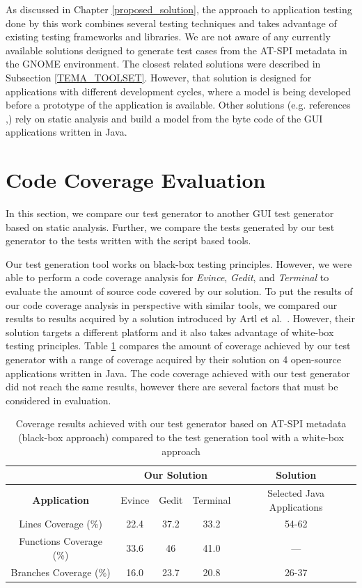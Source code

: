 As discussed in Chapter \ref{proposed_solution}, the approach to application testing done by this work combines several testing techniques and takes advantage of existing testing frameworks and libraries. We are not aware of any currently available solutions designed to generate test cases from the AT-SPI metadata in the GNOME environment. The closest related solutions were described in Subsection \ref{TEMA_TOOLSET}. However, that solution is designed for applications with different development cycles, where a model is being developed before a prototype of the application is available. Other solutions (e.g. references \cite{ReisJacinto2018Aetw},\cite{ArltS2012LSAf}) rely on static analysis and build a model from the byte code of the GUI applications written in Java.

\section{Code Coverage Evaluation}\label{code_coverage_evaluation}
In this section, we compare our test generator to another GUI test generator based on static analysis. Further, we compare the tests generated by our test generator to the tests written with the script based tools. 

Our test generation tool works on black-box testing principles. However, we were able to perform a code coverage analysis for \textit{Evince}, \textit{Gedit}, and \textit{Terminal} to evaluate the amount of source code covered by our solution.  To put the results of our code coverage analysis in perspective with similar tools, we compared our results to results acquired by a solution introduced by Artl et al.~\cite{ArltS2012LSAf}. However, their solution targets a different platform and it also takes advantage of white-box testing principles.
Table \ref{table} compares the amount of coverage achieved by our test generator with a range of coverage acquired by their solution on 4 open-source applications written in Java. The code coverage achieved with our test generator did not reach the same results, however there are several factors that must be considered in evaluation. 

\begin{table}[htb!]
\centering
\label{table}
\begin{tabular}{|c||c|c|c|c|}
\hline
 & \multicolumn{3}{c|}{\textbf{Our Solution}} & \textbf{Solution} \cite{ArltS2012LSAf} \\
\hline
\textbf{Application} &  Evince & Gedit & Terminal & Selected Java Applications   \\
\hline
\hline
Lines Coverage (\%) & 22.4  & 37.2  & 33.2   & 54-62    \\
\hline
Functions Coverage (\%) & 33.6 & 46 & 41.0  &  --- \\
\hline
Branches Coverage (\%) & 16.0 & 23.7 & 20.8 & 26-37  \\
\hline
\end{tabular}
\caption{Coverage results achieved with our test generator based on AT-SPI metadata (black-box approach) compared to the test generation tool \cite{ArltS2012LSAf} with a white-box approach}
\end{table}


